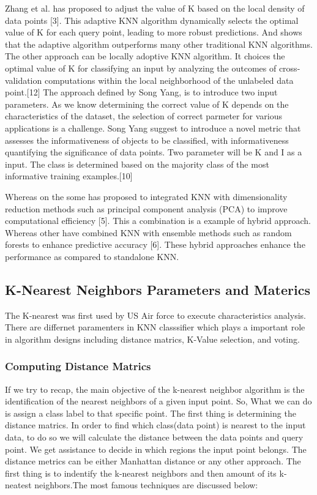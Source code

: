 \documentclass[conference]{IEEEtran}
\begin{document}
Zhang et al. has proposed to adjust the value of K based on the local density of data points [3]. This adaptive KNN algorithm dynamically selects the optimal value of K for each query point, leading to more robust predictions. And shows that the adaptive algorithm outperforms many other traditional KNN algorithms. The other approach can be locally adoptive KNN algorithm. It choices the optimal value of K for classifying an input by analyzing the outcomes of cross-validation computations within the local neighborhood of the unlabeled data point.[12]  The approach defined by Song Yang, is to introduce two input parameters. As we know determining the correct value of K depends on the characteristics of the dataset, the selection of correct parmeter for various applications is a challenge. Song Yang suggest to introduce a novel metric that assesses the informativeness of objects to be classified, with informativeness quantifying the significance of data points. 
Two parameter will be K and I as a input. The class is determined based on the majority class of the most informative training examples.[10]

Whereas on the some has proposed to integrated KNN with dimensionality reduction methods such as principal component analysis (PCA) to improve computational efficiency [5]. This a combination is a example of hybrid approach. Whereas other have combined KNN with ensemble methods such as random forests to enhance predictive accuracy [6]. These hybrid approaches enhance the performance as compared to standalone KNN. 








\subsection{K-Nearest Neighbors Parameters and Materics}
The K-nearest was first used by US Air force to execute characteristics analysis. There are differnet paramenters in KNN classsifier which plays a important role in algorithm designs including distance matrics, K-Value selection, and voting. 




\subsubsection{Computing Distance Matrics}
If we try to recap, the main objective of the k-nearest neighbor algorithm is the identification of the nearest neighbors of a given input point. So, What we can do is assign a class label to that specific point. The first thing is determining the distance matrics. In order to find which class(data point) is nearest to the input data, to do so we will calculate the distance between the data points and query point. We get assistance to decide in which regions the input point belongs. The distance metrics can be either Manhattan distance or any other approach. The first thing is to indentify the k-nearest neighbors and then amount of its k-neatest neighbors.The most famous techniques are discussed below:  
\end{document}
